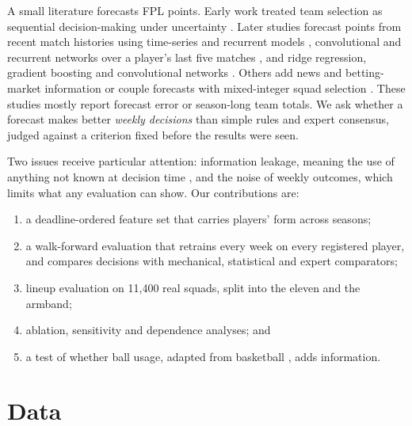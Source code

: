 \documentclass[11pt,a4paper]{article}
\begin{document}
A small literature forecasts FPL points. Early work treated team selection as sequential
decision-making under uncertainty \citep{matthews2012}. Later studies forecast points from recent
match histories using time-series and recurrent models \citep{gupta2019}, convolutional and
recurrent networks over a player's last five matches \citep{lombu2024}, and ridge regression,
gradient boosting and convolutional networks \citep{frees2024}. Others add news and betting-market
information \citep{bonello2019} or couple forecasts with mixed-integer squad selection
\citep{ramezani2025}. These studies mostly report forecast error or season-long team totals. We
ask whether a forecast makes better \emph{weekly decisions} than simple rules and expert consensus,
judged against a criterion fixed before the results were seen.

Two issues receive particular attention: information leakage, meaning the use of anything not
known at decision time \citep{tashman2000}, and the noise of weekly outcomes, which limits what any
evaluation can show. Our contributions are:
\begin{enumerate}
  \item a deadline-ordered feature set that carries players' form across seasons;
  \item a walk-forward evaluation that retrains every week on every registered player, and
        compares decisions with mechanical, statistical and expert comparators;
  \item lineup evaluation on 11{,}400 real squads, split into the eleven and the armband;
  \item ablation, sensitivity and dependence analyses; and
  \item a test of whether ball usage, adapted from basketball \citep{bbrefglossary,oliver2004},
        adds information.
\end{enumerate}

\section{Data}
\end{document}
